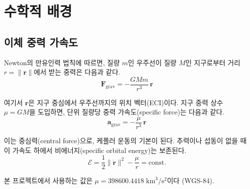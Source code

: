 \documentclass[11pt]{article}
\begin{document}
\drawborder
\thispagestyle{firstpage}

\def\lighterdate{February 12, 2026}

\begin{abstract}
저궤도(LEO) 연속 추력 궤도전이 최적화에서 사용하는 환경 모델을 정의한다. 본 프로젝트의 동역학 모델은 다음 세 가지 가속도 성분의 합으로 구성된다.
\[
\ddot{\mathbf{r}} = \mathbf{a}_{\text{grav}} + \mathbf{a}_{J2} + \mathbf{a}_{\text{drag}} + \mathbf{u}
\]
여기서 $\mathbf{a}_{\text{grav}}$는 이체 중력 가속도, $\mathbf{a}_{J2}$는 지구 비구형(oblateness)에 의한 J2 섭동 가속도, $\mathbf{a}_{\text{drag}}$는 대기 항력 가속도, $\mathbf{u}$는 추력 가속도이다.
본 보고서는 각 환경 모델의 수학적 배경을 유도하고, 이를 코드에 매핑한 방법과 수치 검증 결과를 기술한다. LEO 고도(200--1000\,km)에서 각 섭동원의 상대적 크기를 정량적으로 비교하여, 모델 선택의 타당성을 확인한다.
\end{abstract}


\section{수학적 배경}

\subsection{이체 중력 가속도}

Newton의 만유인력 법칙에 따르면, 질량 $m$인 우주선이 질량 $M$인 지구로부터 거리 $r = \|\mathbf{r}\|$에서 받는 중력은 다음과 같다.
\[
\mathbf{F}_{\text{grav}} = -\frac{GMm}{r^3}\,\mathbf{r}
\]

여기서 $\mathbf{r}$은 지구 중심에서 우주선까지의 위치 벡터(ECI)이다. 지구 중력 상수 $\mu = GM$을 도입하면, 단위 질량당 중력 가속도(specific force)는 다음과 같다.
\[
\mathbf{a}_{\text{grav}} = -\frac{\mu}{r^3}\,\mathbf{r}
\]

이는 중심력(central force)으로, 케플러 운동의 기본이 된다. 추력이나 섭동이 없을 때 이 가속도 하에서 비에너지(specific orbital energy)는 보존된다.
\[
\mathcal{E} = \frac{1}{2}\|\dot{\mathbf{r}}\|^2 - \frac{\mu}{r} = \text{const.}
\]

본 프로젝트에서 사용하는 값은 $\mu = 398600.4418\;\text{km}^3/\text{s}^2$이다 (WGS-84).
\end{document}

